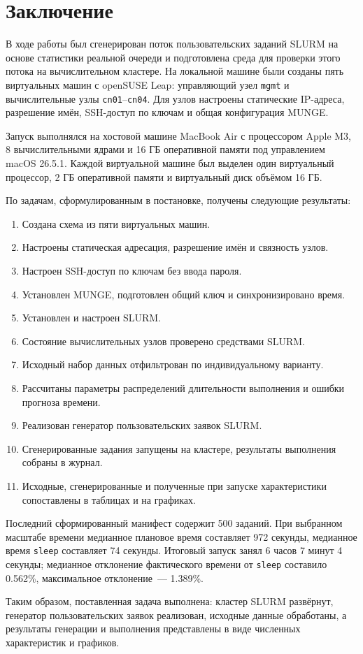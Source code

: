 \section*{Заключение}

В ходе работы был сгенерирован поток пользовательских заданий SLURM на основе статистики реальной очереди и подготовлена среда для проверки этого потока на вычислительном кластере. На локальной машине были созданы пять виртуальных машин с openSUSE Leap: управляющий узел \texttt{mgmt} и вычислительные узлы \texttt{cn01}--\texttt{cn04}. Для узлов настроены статические IP-адреса, разрешение имён, SSH-доступ по ключам и общая конфигурация MUNGE.

Запуск выполнялся на хостовой машине MacBook Air с процессором Apple M3, 8 вычислительными ядрами и 16 ГБ оперативной памяти под управлением macOS 26.5.1. Каждой виртуальной машине был выделен один виртуальный процессор, 2 ГБ оперативной памяти и виртуальный диск объёмом 16 ГБ.

По задачам, сформулированным в постановке, получены следующие результаты:

\begin{enumerate}
    \item Создана схема из пяти виртуальных машин.
    \item Настроены статическая адресация, разрешение имён и связность узлов.
    \item Настроен SSH-доступ по ключам без ввода пароля.
    \item Установлен MUNGE, подготовлен общий ключ и синхронизировано время.
    \item Установлен и настроен SLURM.
    \item Состояние вычислительных узлов проверено средствами SLURM.
    \item Исходный набор данных отфильтрован по индивидуальному варианту.
    \item Рассчитаны параметры распределений длительности выполнения и ошибки прогноза времени.
    \item Реализован генератор пользовательских заявок SLURM.
    \item Сгенерированные задания запущены на кластере, результаты выполнения собраны в журнал.
    \item Исходные, сгенерированные и полученные при запуске характеристики сопоставлены в таблицах и на графиках.
\end{enumerate}

Последний сформированный манифест содержит 500 заданий. При выбранном масштабе времени медианное плановое время составляет 972 секунды, медианное время \texttt{sleep} составляет 74 секунды. Итоговый запуск занял 6 часов 7 минут 4 секунды; медианное отклонение фактического времени от \texttt{sleep} составило 0.562\%, максимальное отклонение~--- 1.389\%.

Таким образом, поставленная задача выполнена: кластер SLURM развёрнут, генератор пользовательских заявок реализован, исходные данные обработаны, а результаты генерации и выполнения представлены в виде численных характеристик и графиков.
